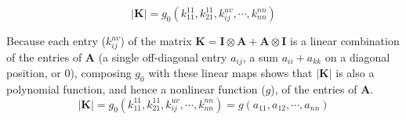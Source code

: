 \documentclass{article}
\begin{document}
\begin{equation}
|\mathbf{K}|=g_{0}(k_{11}^{11},k_{21}^{11}, k_{ij}^{uv},\cdots, k_{nn}^{nn})
\label{eq:det_k}
\end{equation}

Because each entry ($k_{ij}^{uv}$) of the matrix $\mathbf{K}=\mathbf{I} \otimes \mathbf{A}+ \mathbf{A} \otimes \mathbf{I}$ is a linear combination of the entries of $\mathbf{A}$ (a single off-diagonal entry $a_{ij}$, a sum $a_{ii}+a_{kk}$ on a diagonal position, or $0$), composing $g_{0}$ with these linear maps shows that $|\mathbf{K}|$ is also a polynomial function, and hence a nonlinear function ($g$), of the entries of $\mathbf{A}$.
\begin{equation}
|\mathbf{K}|=
g_{0}(k_{11}^{11},k_{21}^{11}, k_{ij}^{uv},\cdots, k_{nn}^{nn})=g(a_{11},a_{12},\cdots, a_{nn})
\end{equation}
\end{document}
